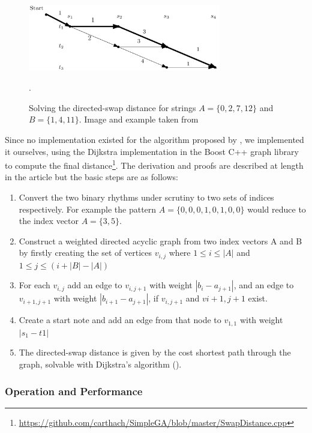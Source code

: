 \begin{figure}
	\begin{center}
		\includegraphics[width=0.75\textwidth]{ch03_symbolic/figures/shortest_path.png}
	\end{center}
	\caption[Solving the directed-swap distance graph for two strings]{Solving the directed-swap distance for strings $A=\{0,2,7,12\}$ and $B=\{1,4,11\}$. Image and example taken from \cite{Colannino2005}}.
	\label{fig:dijkstra}
\end{figure}

Since no implementation existed for the algorithm proposed by \cite{Colannino2005}, we implemented it ourselves, using the Dijkstra implementation in the Boost C++ graph library \citep{Siek2002} to compute the final distance\footnote{\url{https://github.com/carthach/SimpleGA/blob/master/SwapDistance.cpp}}. The derivation and proofs are described at length in the article but the basic steps are as follows:

\begin{enumerate}
  \item Convert the two binary rhythms under scrutiny to two sets of indices respectively. For example the pattern $A = \{0, 0, 0, 1, 0, 1, 0, 0\}$ would reduce to the index vector $A = \{3, 5\}$.
  \item Construct a weighted directed acyclic graph from two index vectors A and B by firstly creating the set of vertices $v_{i,j}$ where $1 \leq i \leq |A|$ and $1 \leq j \leq (i+|B|-|A|)$
  \item For each $v_{i,j}$ add an edge to $v_{i, j+1}$ with weight $|b_{i}-a_{j+1}|$, and an edge to $v_{i+1, j+1}$ with weight $|b_{i+1}-a_{j+1}|$, if $v_{i, j+1}$ and $v{i+1, j+1}$ exist.
  \item Create a start note and add an edge from that node to $v_{1,1}$ with weight $|s_{1}-t{1}|$
  \item The directed-swap distance is given by the cost shortest path through the graph, solvable with Dijkstra's algorithm ().
\end{enumerate}

\subsubsection{Operation and Performance}

